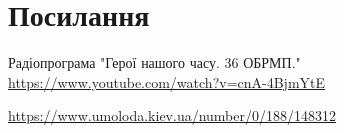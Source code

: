  
 
\chapter{Посилання}

Радіопрограма "Герої нашого часу. 36 ОБРМП."
\url{https://www.youtube.com/watch?v=cnA-4BjmYtE}

\url{https://www.umoloda.kiev.ua/number/0/188/148312}
  
